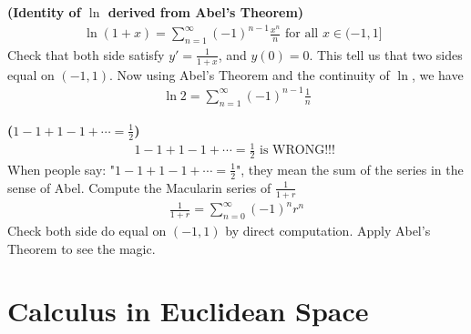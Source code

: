 \documentclass{report}
\begin{document}
\begin{mdframed}
\begin{Example}{\textbf{(Identity of $\ln$ derived from Abel's Theorem)}}{}
\begin{align*}
  \ln (1+x)=\sum_{n=1}^{\infty} (-1)^{n-1} \frac{x^n}{n}\text{ for all $x \in (-1,1]$ }
\end{align*}
Check that both side satisfy $y'=\frac{1}{1+x}$, and $y(0)=0$. This tell us that two sides equal on  $(-1,1)$. Now using Abel's Theorem and the continuity of $\ln$, we have 
\begin{align*}
\ln 2= \sum_{n=1}^{\infty} (-1)^{n-1} \frac{1}{n}
\end{align*}
\end{Example}
\begin{Example}{\textbf{($1-1+1-1+\cdots=\frac{1}{2}$)}}{}
\begin{align*}
1-1+1-1+\cdots = \frac{1}{2}\text{ is WRONG!!! }
\end{align*}
When people say: "$1-1+1-1+\cdots =\frac{1}{2}$", they mean the sum of the series in the sense of Abel. Compute the Macularin series of $\frac{1}{1+r}$
\begin{align*}
\frac{1}{1+r}=\sum_{n=0}^{\infty}(-1)^nr^n
\end{align*}
Check both side do equal on $(-1,1)$ by direct computation. Apply Abel's Theorem to see the magic. 
\end{Example}
\end{mdframed}

\chapter{Calculus in Euclidean Space}
\end{document}
